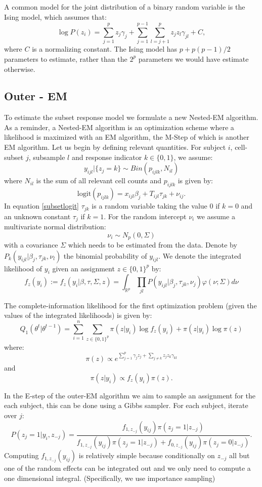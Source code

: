 \documentclass{article}\usepackage[]{graphicx}\usepackage[]{color}
\begin{document}
A common model for the joint distribution of a binary random variable is the Ising model, which assumes that:
$$
\log P(z_i) = \sum_{j=1}^{p} z_{j} \gamma_j + \sum_{j=1}^{p - 1}\sum_{l=j + 1}^{p} z_{j} z_{l} \gamma_{jl} + C,
$$
where $C$ is a normalizing constant. The Ising model has $p + p(p-1)/2$ parameters to estimate, rather than the $2^{p}$ parameters we would have estimate otherwise. 




\subsection{Outer - EM}
To estimate the subset response model we formulate a new Nested-EM algorithm. As a reminder, a Nested-EM\textregistered{} algorithm is an optimization scheme where a likelihood is maximized with an EM algorithm, the M-Step of which is another EM algorithm. Let us begin by defining relevant quantities. For subject $i$, cell-subset $j$, subsample $l$ and response indicator $k\in \{0,1\}$, we assume:
$$
y_{ijl} | \{z_j = k\}  \sim Bin(p_{ijlk}, N_{il})
$$
where $N_{il}$ is the sum of all relevant cell counts and $p_{ijlk}$ is given by:
\begin{equation}\label{subsetlogit}
\text{logit}(p_{ijlk}) = x_{ijl} \beta_{j} + T_{ijl}\tau_{jk} + \nu_{ij}.
\end{equation}
In equation \eqref{subsetlogit} $\tau_{jk}$ is a random variable taking the value $0$ if $k =0$ and an unknown constant $\tau_{j}$ if $k = 1$. For the random intercept $\nu_{i}$ we assume a multivariate normal distribution:
$$
\nu_i \sim N_p(0, \Sigma)
$$ 
with a covariance $\Sigma$ which needs to be estimated from the data. Denote by $P_k(y_{ijl} | \beta_{j}, \tau_{jk}, \nu_l)$ the binomial probability of $y_{ijl}$. We denote the integrated likelihood of $y_{i}$ given an assignment $z \in \{0, 1\}^p$ by:
$$
f_z(y_i) := f_z(y_i | \beta, \tau, \Sigma, z) = \int_{\mathbb{R}^{p}} \prod_{jl} P(y_{ijl} | \beta_{j}, \tau_{jk},\nu_j)\varphi(\nu; \Sigma) d\nu
$$

The complete-information likelihood for the first optimization problem (given the values of the integrated likelihoods) is given by:
$$
Q_1(\theta^t | \theta^{t-1}) = 
\sum_{i=1}^{n}\sum_{z \in \{0,1\}^p} \pi (z | y_i)\log f_z(y_i) + \pi(z | y_i) \log \pi (z)
$$
where:
$$
\pi(z) \propto e^{\sum_{j=1}^{p} \gamma_j z_j + \sum_{j \neq k} z_j z_k \gamma_{kl} }
$$
and
$$
\pi(z | y_i) \propto f_z(y_i) \pi(z).
$$

In the E-step of the outer-EM algorithm we aim to sample an assignment for the each subject, this can be done using a Gibbs sampler. For each subject, iterate over $j$:
$$
P(z_j = 1 | y_i, z_{-j}) = \frac{f_{1, z_{-j}}(y_{ij}) \pi (z_j = 1 | z_{-j})}
{f_{1, z_{-j}}(y_{ij}) \pi (z_j = 1 | z_{-j}) + f_{0, z_{-j}}(y_{ij}) \pi (z_j = 0 | z_{-j})}.
$$
Computing $f_{1, z_{-j}}(y_{ij})$ is relatively simple because conditionally on $z_{-j}$ all but one of the random effects can be integrated out and we only need to compute a one dimensional integral. (Specifically, we use importance sampling)
\end{document}
